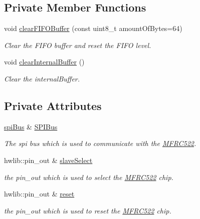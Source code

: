 \subsection*{Private Member Functions}
\begin{DoxyCompactItemize}
\item 
void \mbox{\hyperlink{class_m_f_r_c522_a0fa1703360d0c741cf915b22e26c2631}{clear\+F\+I\+F\+O\+Buffer}} (const uint8\+\_\+t amount\+Of\+Bytes=64)
\begin{DoxyCompactList}\small\item\em Clear the F\+I\+FO buffer and reset the F\+I\+FO level. \end{DoxyCompactList}\item 
void \mbox{\hyperlink{class_m_f_r_c522_a9d2c5ad7b977944e8bcbbcc9c1bb9b75}{clear\+Internal\+Buffer}} ()
\begin{DoxyCompactList}\small\item\em Clear the internal\+Buffer. \end{DoxyCompactList}\end{DoxyCompactItemize}
\subsection*{Private Attributes}
\begin{DoxyCompactItemize}
\item 
\mbox{\hyperlink{classspi_bus}{spi\+Bus}} \& \mbox{\hyperlink{class_m_f_r_c522_a76b0186fcad01aafd3d7d7ae4da6a68c}{S\+P\+I\+Bus}}
\begin{DoxyCompactList}\small\item\em The spi bus which is used to communicate with the \mbox{\hyperlink{class_m_f_r_c522}{M\+F\+R\+C522}}. \end{DoxyCompactList}\item 
\mbox{\label{class_m_f_r_c522_ab945c275a8644e226def9f3eee6698a2}} 
hwlib\+::pin\+\_\+out \& \mbox{\hyperlink{class_m_f_r_c522_ab945c275a8644e226def9f3eee6698a2}{slave\+Select}}
\begin{DoxyCompactList}\small\item\em the pin\+\_\+out which is used to select the \mbox{\hyperlink{class_m_f_r_c522}{M\+F\+R\+C522}} chip. \end{DoxyCompactList}\item 
\mbox{\label{class_m_f_r_c522_a924c7dced5cb615461a0c9f353076407}} 
hwlib\+::pin\+\_\+out \& \mbox{\hyperlink{class_m_f_r_c522_a924c7dced5cb615461a0c9f353076407}{reset}}
\begin{DoxyCompactList}\small\item\em the pin\+\_\+out which is used to reset the \mbox{\hyperlink{class_m_f_r_c522}{M\+F\+R\+C522}} chip. \end{DoxyCompactList}\end{DoxyCompactItemize}


